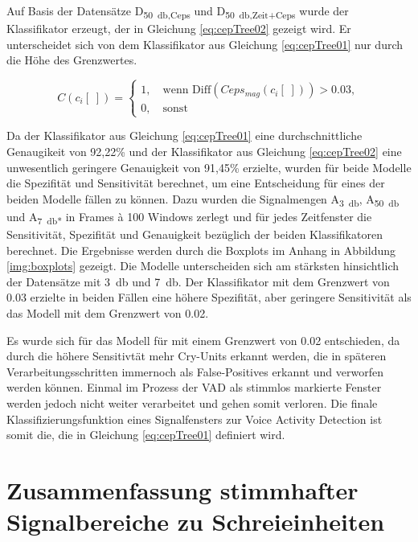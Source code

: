 Auf Basis der Datensätze D\textsubscript{\SI{50}{\decibel},Ceps} und D\textsubscript{\SI{50}{\decibel},Zeit+Ceps} wurde der Klassifikator erzeugt, der in Gleichung \ref{eq:cepTree02} gezeigt wird. Er unterscheidet sich von dem Klassifikator aus Gleichung \ref{eq:cepTree01} nur durch die Höhe des Grenzwertes.

\begin{equation}
C(c_i[\;]) = \begin{cases}
1, \quad \text{wenn  Diff}(Ceps_{mag}(c_i[\;])) > 0.03, \\
0, \quad \text{sonst}
\end{cases}
\label{eq:cepTree02}
\end{equation}

Da der Klassifikator aus Gleichung \ref{eq:cepTree01} eine durchschnittliche Genaugikeit von 92,22\% und der Klassifikator aus Gleichung \ref{eq:cepTree02} eine unwesentlich geringere Genauigkeit von 91,45\% erzielte, wurden für beide Modelle die Spezifität und Sensitivität berechnet, um eine Entscheidung für eines der beiden Modelle fällen zu können. Dazu wurden die Signalmengen A\textsubscript{\SI{3}{\decibel}}, A\textsubscript{\SI{50}{\decibel}} und A\textsubscript{\SI{7}{\decibel}*} in Frames \`{a} 100 Windows zerlegt und für jedes Zeitfenster die Sensitivität, Spezifität und Genauigkeit bezüglich der beiden Klassifikatoren berechnet. Die Ergebnisse werden durch die Boxplots im Anhang in Abbildung \ref{img:boxplots} gezeigt. Die Modelle unterscheiden sich am stärksten hinsichtlich der Datensätze mit \SI{3}{\decibel} und \SI{7}{\decibel}. Der Klassifikator mit dem Grenzwert von 0.03 erzielte in beiden Fällen eine höhere Spezifität, aber geringere Sensitivität als das Modell mit dem Grenzwert von 0.02. 

Es wurde sich für das Modell für mit einem Grenzwert von 0.02 entschieden, da durch die höhere Sensitivtät mehr Cry-Units erkannt werden, die in späteren Verarbeitungsschritten immernoch als False-Positives erkannt und verworfen werden können. Einmal im Prozess der VAD als stimmlos markierte Fenster werden jedoch nicht weiter verarbeitet und gehen somit \glqq verloren\grqq. Die finale Klassifizierungsfunktion eines Signalfensters zur Voice Activity Detection ist somit die, die in Gleichung \ref{eq:cepTree01} definiert wird.

\section{Zusammenfassung stimmhafter Signalbereiche zu Schreieinheiten}
\label{sec:marking_cry-units_new}

